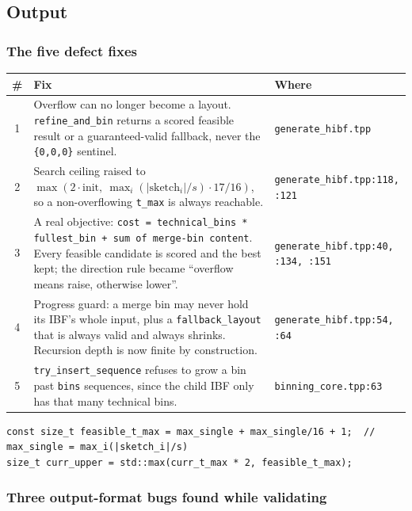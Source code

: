 \documentclass[11pt,a4paper]{article}
\newcommand{\code}[1]{\lstinline[basicstyle=\ttfamily\small]!#1!}
\begin{document}
\subsection*{Output}
\subsubsection*{The five defect fixes}

\begin{longtable}{@{}cp{9.0cm}p{4.6cm}@{}}
\toprule
\textbf{\#} & \textbf{Fix} & \textbf{Where} \\
\midrule
\endhead
1 & Overflow can no longer become a layout. \code{refine_and_bin} returns a scored feasible result
    or a guaranteed-valid fallback, never the \code{{0,0,0}} sentinel. &
    \texttt{generate\_hibf.tpp} \\
2 & Search ceiling raised to $\max(2 \cdot \text{init},\ \max_i(|\text{sketch}_i|/s)\cdot 17/16)$,
    so a non-overflowing \code{t_max} is always reachable. & \texttt{generate\_hibf.tpp:118, :121} \\
3 & A real objective: \code{cost = technical_bins * fullest_bin + sum of merge-bin content}. Every
    feasible candidate is scored and the best kept; the direction rule became ``overflow means
    raise, otherwise lower''. & \texttt{generate\_hibf.tpp:40, :134, :151} \\
4 & Progress guard: a merge bin may never hold its IBF's whole input, plus a
    \code{fallback_layout} that is always valid and always shrinks. Recursion depth is now finite
    by construction. & \texttt{generate\_hibf.tpp:54, :64} \\
5 & \code{try_insert_sequence} refuses to grow a bin past \code{bins} sequences, since the child
    IBF only has that many technical bins. & \texttt{binning\_core.tpp:63} \\
\bottomrule
\end{longtable}

\begin{lstlisting}[style=codestyle,caption={Fix 2: above max\_single nothing is split, so binning\_core cannot run out of bins}]
const size_t feasible_t_max = max_single + max_single/16 + 1;  // max_single = max_i(|sketch_i|/s)
size_t curr_upper = std::max(curr_t_max * 2, feasible_t_max);
\end{lstlisting}

\subsubsection*{Three output-format bugs found while validating}
\end{document}
